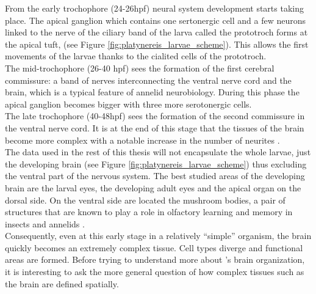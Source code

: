      From the early trochophore (24-26hpf) neural system development starts taking place. The apical ganglion which contains one sertonergic cell and a few neurons linked to the nerve of the ciliary band of the larva called the prototroch forms at the apical tuft, (see Figure \ref{fig:platynereis_larvae_scheme}). This allows the first movements of the larvae thanks to the cialited cells of the prototroch.\\
     
     The mid-trochophore (26-40 hpf) sees the formation of the first cerebral commissure: a band of nerves interconnecting the ventral nerve cord and the brain, which is a typical feature of annelid neurobiology. During this phase the apical ganglion becomes bigger with three more serotonergic cells.\\
     
     The late trochophore (40-48hpf) sees the formation of the second commissure in the ventral nerve cord. It is at the end of this stage that the tissues of the brain become more complex with a notable increase in the number of neurites \citep{Fischer10}.\\
     
     The data used in the rest of this thesis will not encapsulate the whole larvae, just the developing brain (see Figure \ref{fig:platynereis_larvae_scheme}) thus excluding the ventral part of the nervous system. The best studied areas of the developing brain are the larval eyes, the developing adult eyes and the apical organ on the dorsal side. On the ventral side are located the mushroom bodies, a pair of structures that are known to play a role in olfactory learning and memory in insects and annelids \citep{Tomer10}.\\
     
     Consequently, even at this early stage in a relatively ``simple'' organism, the brain quickly becomes an extremely complex tissue. Cell types diverge and functional areas are formed. Before trying to understand more about \platy{}'s brain organization, it is interesting to ask the more general question of how complex tissues such as the brain are defined spatially.
     
